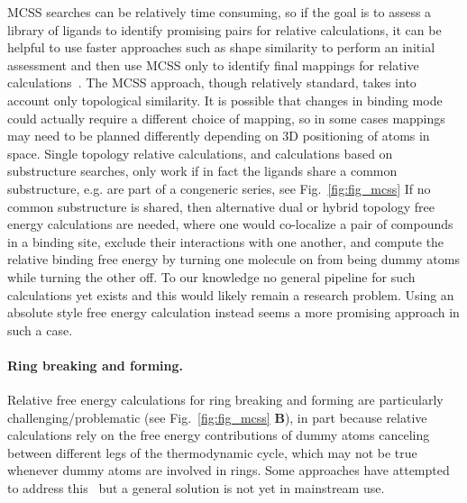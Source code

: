 \documentclass[9pt,bestpractices]{livecoms}
\begin{document}
%
MCSS searches can be relatively time consuming, so if the goal is to assess a library of ligands to identify promising pairs for relative calculations, it can be helpful to use faster approaches such as shape similarity to perform an initial assessment and then use MCSS only to identify final mappings for relative calculations~\cite{raymond2002maximum,klabunde2012mars,jones2009elucidating}.
%
The MCSS approach, though relatively standard, takes into account only topological similarity. It is possible that changes in binding mode could actually require a different choice of mapping, so in some cases mappings may need to be planned differently depending on 3D positioning of atoms in space.
%
Single topology relative calculations, and calculations based on substructure searches, only work if in fact the ligands share a common substructure, e.g. are part of a congeneric series, see Fig.~\ref{fig:fig_mcss}
If no common substructure is shared, then alternative dual or hybrid topology free energy calculations are needed, where one would co-localize a pair of compounds in a binding site, exclude their interactions with one another, and compute the relative binding free energy by turning one molecule on from being dummy atoms while turning the other off.
To our knowledge no general pipeline for such calculations yet exists and this would likely remain a research problem. Using an absolute style free energy calculation instead seems a more promising approach in such a case. 
%
\paragraph{Ring breaking and forming.} Relative free energy calculations for ring breaking and forming are particularly challenging/problematic (see Fig.~\ref{fig:fig_mcss} \textbf{B}), in part because relative calculations rely on the free energy contributions of dummy atoms canceling between different legs of the thermodynamic cycle, which may not be true whenever dummy atoms are involved in rings.
Some approaches have attempted to address this~\cite{clark2019relative} but a general solution is not yet in mainstream use.
%
\end{document}
